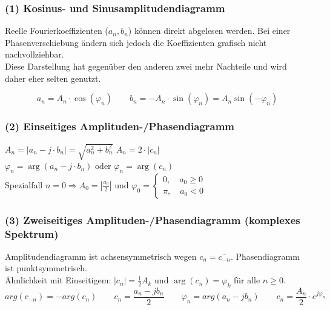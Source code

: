 \subsubsection{(1) Kosinus- und Sinusamplitudendiagramm} 
Reelle Fourierkoeffizienten ($a_n, b_n$) können direkt abgelesen werden. 
Bei einer Phasenverschiebung ändern sich jedoch die Koeffizienten grafisch nicht nachvollziehbar. \\
Diese Darstellung hat gegenüber den anderen zwei mehr Nachteile und wird daher eher selten genutzt.

$$a_n = A_n \cdot \cos(\varphi_n) \qquad b_n = -A_n \cdot \sin(\varphi_n) = A_n \sin(-\varphi_n)$$


\subsubsection{(2) Einseitiges Amplituden-/Phasendiagramm} 
$A_n = |a_n - j \cdot b_n| = \sqrt{a_n^2 + b_n^2}$  $A_n = 2 \cdot |c_n| \qquad$
$\varphi_n = \arg(a_n - j \cdot b_n) \text{ oder } \varphi_n = \arg(c_n) $ \\
Spezialfall $n=0 \Rightarrow A_0 = |\frac{a_0}{2}| \text{ und } \varphi_0 = \left\{
		\begin{array}{l} 
			0, \quad a_0 \geq 0\\
			\pi, \quad a_0 < 0  
		\end{array}
	    \right. $\\


\subsubsection{(3) Zweiseitiges Amplituden-/Phasendiagramm (komplexes Spektrum)} 
Amplitudendiagramm ist achsensymmetrisch wegen $ c_n=\overline{c_{-n}} $. Phasendiagramm ist punktsymmetrisch. \\
Ähnlichkeit mit Einseitigem: $|c_n| = \frac{1}{2}A_k $ und $\arg(c_n) = \varphi_k$ für alle $ n \geq 0$.\\
$$arg(c_{-n}) = -arg(c_n) \qquad c_n = \frac{a_n - jb_n}{2} \qquad \varphi_n = arg(a_n - jb_n) \qquad c_n = \frac{A_n}{2} \cdot e^{j\varphi_n}$$


